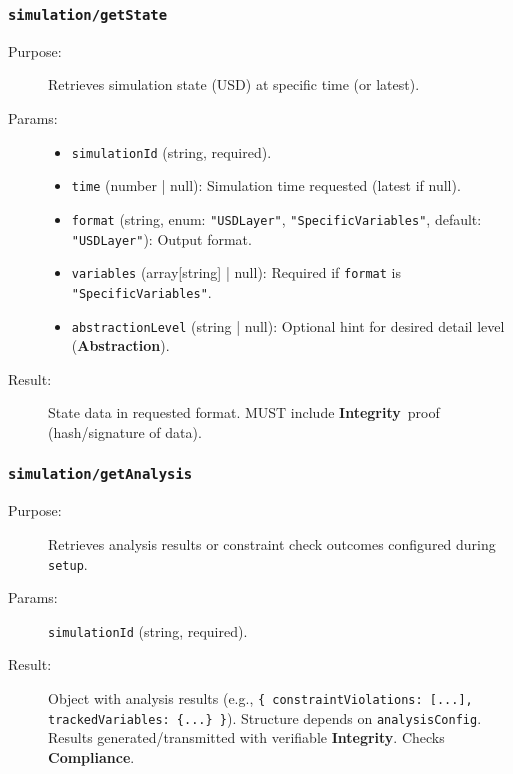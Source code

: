 \documentclass[12pt,a4paper]{report}
\newcommand{\Integrity}{\textbf{Integrity}}
\newcommand{\Abstraction}{\textbf{Abstraction}}
\begin{document}
	\subsubsection{\texttt{simulation/getState}}
	\label{app:oasim_sim_getstate}
	\begin{description}
		\item[Purpose:] Retrieves simulation state (USD) at specific time (or latest).
		\item[Params:]
		\begin{itemize} \itemsep0em
			\item \texttt{simulationId} (string, required).
			\item \texttt{time} (number | null): Simulation time requested (latest if null).
			\item \texttt{format} (string, enum: \texttt{"USDLayer"}, \texttt{"SpecificVariables"}, default: \texttt{"USDLayer"}): Output format.
			\item \texttt{variables} (array[string] | null): Required if \texttt{format} is \texttt{"SpecificVariables"}.
			\item \texttt{abstractionLevel} (string | null): Optional hint for desired detail level (\Abstraction).
		\end{itemize}
		\item[Result:] State data in requested format. MUST include \Integrity\ proof (hash/signature of data).
	\end{description}
	
	\subsubsection{\texttt{simulation/getAnalysis}}
	\label{app:oasim_sim_getanalysis}
	\begin{description}
		\item[Purpose:] Retrieves analysis results or constraint check outcomes configured during \texttt{setup}.
		\item[Params:] \texttt{simulationId} (string, required).
		\item[Result:] Object with analysis results (e.g., \texttt{\{ constraintViolations: [...], trackedVariables: \{...\} \}}). Structure depends on \texttt{analysisConfig}. Results generated/transmitted with verifiable \Integrity. Checks \textbf{Compliance}.
	\end{description}
	
\end{document}
